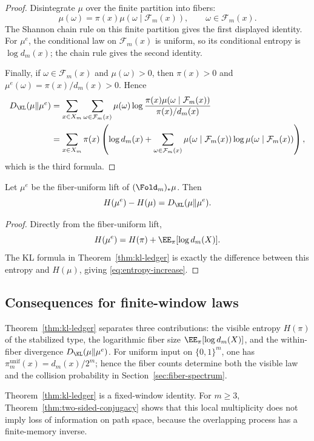 \begin{proof}
Disintegrate $\mu$ over the finite partition into fibers:
\[
\mu(\omega)=\pi(x)\mu(\omega\mid\mathcal F_m(x)),
\qquad \omega\in\mathcal F_m(x).
\]
The Shannon chain rule on this finite partition gives the first displayed
identity.  For $\mu^e$, the conditional law on $\mathcal F_m(x)$ is uniform,
so its conditional entropy is $\log d_m(x)$; the chain rule gives the second
identity.

Finally, if $\omega\in\mathcal F_m(x)$ and $\mu(\omega)>0$, then
$\pi(x)>0$ and $\mu^e(\omega)=\pi(x)/d_m(x)>0$.  Hence
\[
\begin{aligned}
D_{\KL}(\mu\|\mu^e)
&=\sum_{x\in X_m}\sum_{\omega\in\mathcal F_m(x)}
\mu(\omega)\log
\frac{\pi(x)\mu(\omega\mid\mathcal F_m(x))}{\pi(x)/d_m(x)}\\
&=\sum_{x\in X_m}\pi(x)
\left(
\log d_m(x)+
\sum_{\omega\in\mathcal F_m(x)}
\mu(\omega\mid\mathcal F_m(x))
\log\mu(\omega\mid\mathcal F_m(x))
\right),
\end{aligned}
\]
which is the third formula.
\end{proof}

\begin{corollary}\label{cor:entropy-increase}
Let $\mu^e$ be the fiber-uniform lift of $(\Fold_m)_*\mu$. Then
\begin{equation}\label{eq:entropy-increase}
H(\mu^e)-H(\mu)=D_{\KL}(\mu\|\mu^e).
\end{equation}
\end{corollary}

\begin{proof}
Directly from the fiber-uniform lift,
\[
H(\mu^e)=H(\pi)+\EE_\pi[\log d_m(X)].
\]
The KL formula in Theorem~\ref{thm:kl-ledger} is exactly the difference
between this entropy and $H(\mu)$, giving \eqref{eq:entropy-increase}.
\end{proof}

\subsection{Consequences for finite-window laws}\label{sec:entropy-ledger:consequences}

\begin{remark}
Theorem~\ref{thm:kl-ledger} separates three contributions: the visible
entropy $H(\pi)$ of the stabilized type, the logarithmic fiber size
$\EE_\pi[\log d_m(X)]$, and the within-fiber divergence
$D_{\KL}(\mu\|\mu^e)$. For uniform input on $\{0,1\}^m$, one has
$\pi_m^{\mathrm{unif}}(x)=d_m(x)/2^m$; hence the fiber counts determine both
the visible law and the collision probability in Section~\ref{sec:fiber-spectrum}.
\end{remark}

\begin{remark}
Theorem~\ref{thm:kl-ledger} is a fixed-window identity. For $m\ge3$, Theorem~\ref{thm:two-sided-conjugacy} shows that this local multiplicity does not imply loss of information on path space, because the overlapping process has a finite-memory inverse.
\end{remark}
